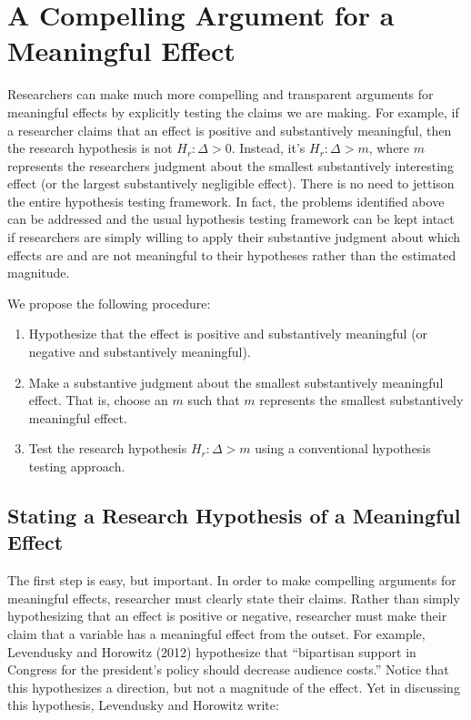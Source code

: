 \documentclass[12pt]{article}
\begin{document}
\section*{A Compelling Argument for a Meaningful Effect}

Researchers can make much more compelling and transparent arguments for meaningful effects by explicitly testing the claims we are making. For example, if  a researcher claims that an effect is positive and substantively meaningful, then the research hypothesis is not $H_r: \Delta > 0$. Instead, it's $H_r: \Delta > m$, where $m$ represents the researchers judgment about the smallest substantively interesting effect (or the largest substantively negligible effect). There is no need to jettison the entire hypothesis testing framework. In fact, the problems identified above can be addressed and the usual hypothesis testing framework can be kept intact if researchers are simply willing to apply their substantive judgment about which effects are and are not meaningful to their hypotheses rather than the estimated magnitude. 

We propose the following procedure:

\begin{enumerate}
\item Hypothesize that the effect is positive and substantively meaningful (or negative and substantively meaningful).
\item Make a substantive judgment about the smallest substantively meaningful effect. That is, choose an $m$ such that $m$ represents the smallest substantively meaningful effect.
\item Test the research hypothesis $H_r: \Delta > m$ using a conventional hypothesis testing approach.
\end{enumerate}

\subsection*{Stating a Research Hypothesis of a Meaningful Effect}

The first step is easy, but important. In order to make compelling arguments for meaningful effects, researcher must clearly state their claims. Rather than simply hypothesizing that an effect is positive or negative, researcher must make their claim that a variable has a meaningful effect from the outset. For example, Levendusky and Horowitz (2012) hypothesize that ``bipartisan support in Congress for the president's policy should decrease audience costs.'' Notice that this hypothesizes a direction, but not a magnitude of the effect. Yet in discussing this hypothesis, Levendusky and Horowitz write: 
\end{document}
